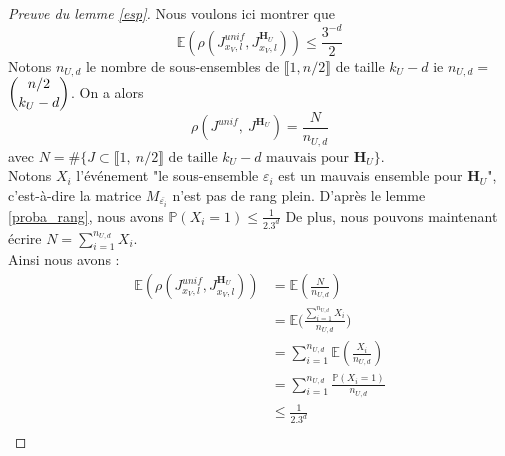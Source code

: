 \documentclass[12pt]{article}
\theoremstyle{plain}
\theoremstyle{definition}
\begin{document}
\begin{appendix}
\begin{proof}[Preuve du lemme \ref{esp}]
Nous voulons ici montrer que $$ \mathbb{E}\left(\rho\left(J_{x_V,l}^{unif},J_{x_V, l}^{\mathbf{H}_U}\right)\right) \leq \frac{3^{-d}}{2} $$
Notons $n_{U,d}$ le nombre de sous-ensembles de $\llbracket 1, n/2\rrbracket$ de taille $k_U-d$ ie \mbox{$n_{U,d} = $ {\scriptsize$\dbinom{n/2}{k_U-d}$}}. On a alors $$\rho(J^{unif},\ J^{\mathbf{H}_U}) = \frac{N}{n_{U,d}}$$ avec $N = \#\{J \subset \llbracket 1,\ n/2\rrbracket \text{ de taille } k_U - d \text{ mauvais pour } \mathbf{H}_U\}$.\\
Notons $X_i$ l'événement "le sous-ensemble $\varepsilon_i$ est un mauvais ensemble pour $\mathbf{H}_U$", c'est-à-dire la matrice $M_{\overline{\varepsilon_i}}$ n'est pas de rang plein. D'après le lemme \ref{proba_rang}, nous avons $\mathbb{P}(X_i = 1)\leq \frac{1}{2.3^d}$
De plus, nous pouvons maintenant écrire $N = \sum\limits_{i=1}^{n_{U,d}}X_i$.\\
Ainsi nous avons :
\begin{equation*}
\begin{split}
\mathbb{E}\left(\rho\left(J_{x_V,l}^{unif},J_{x_V, l}^{\mathbf{H}_U}\right)\right)  &= \mathbb{E}\left(\frac{N}{n_{U,d}}\right)  \\
&= \mathbb{E}\Bigg(\frac{\sum\limits_{i=1}^{n_{U,d}}X_i}{n_{U,d}}\Bigg)\\
&= \sum\limits_{i=1}^{n_{U,d}}\mathbb{E}\left(\frac{X_i}{n_{U,d}}\right)\\
&= \sum\limits_{i=1}^{n_{U,d}}\frac{\mathbb{P}(X_i = 1)}{n_{U,d}}\\
&\leq \frac{1}{2.3^d}\\
\end{split}
\end{equation*}
\end{proof}



\end{appendix}
\end{document}
